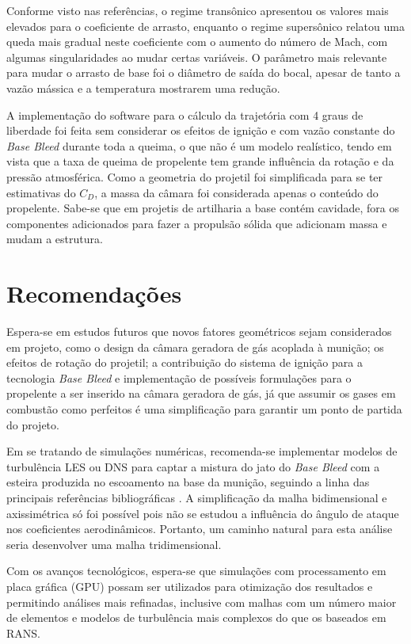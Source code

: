 Conforme visto nas referências, o regime transônico apresentou os valores mais elevados para o coeficiente de arrasto, enquanto o regime supersônico relatou uma queda mais gradual neste coeficiente com o aumento do número de Mach, com algumas singularidades ao mudar certas variáveis. O parâmetro mais relevante para mudar o arrasto de base foi o diâmetro de saída do bocal, apesar de tanto a vazão mássica e a temperatura mostrarem uma redução.

A implementação do software para o cálculo da trajetória com 4 graus de liberdade foi feita sem considerar os efeitos de ignição e com vazão constante do \textit{Base Bleed} durante toda a queima, o que não é um modelo realístico, tendo em vista que a taxa de queima de propelente tem grande influência da rotação e da pressão atmosférica. Como a geometria do projetil foi simplificada para se ter estimativas do $C_D$, a massa da câmara foi considerada apenas o conteúdo do propelente. Sabe-se que em projetis de artilharia a base contém cavidade, fora os componentes adicionados para fazer a propulsão sólida que adicionam massa e mudam a estrutura.

\section{Recomendações}

Espera-se em estudos futuros que novos fatores geométricos sejam considerados em projeto, como o design da câmara geradora de gás acoplada à munição; os efeitos de rotação do projetil; a contribuição do sistema de ignição para a tecnologia \textit{Base Bleed} e implementação de possíveis formulações para o propelente a ser inserido na câmara geradora de gás, já que assumir os gases em combustão como perfeitos é uma simplificação para garantir um ponto de partida do projeto. 

Em se tratando de simulações numéricas, recomenda-se implementar modelos de turbulência LES ou DNS para captar a mistura do jato do \textit{Base Bleed} com a esteira produzida no escoamento na base da munição, seguindo a linha das principais referências bibliográficas \cite{nicolas-perez_accuracy_2017,Lucena2020}. A simplificação da malha bidimensional e axissimétrica só foi possível pois não se estudou a influência do ângulo de ataque nos coeficientes aerodinâmicos. Portanto, um caminho natural para esta análise seria desenvolver uma malha tridimensional.

Com os avanços tecnológicos, espera-se que simulações com processamento em placa gráfica (GPU) possam ser utilizados para otimização dos resultados e permitindo análises mais refinadas, inclusive com malhas com um número maior de elementos e modelos de turbulência mais complexos do que os baseados em RANS.

